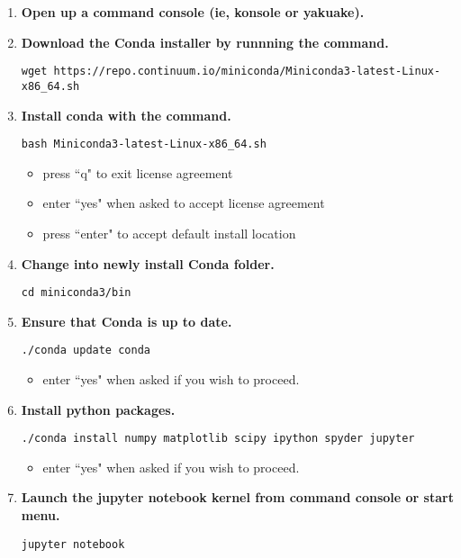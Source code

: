 \documentclass{../../../assets/LabArx-Dev} 	%
\begin{document}
\begin{enumerate}

\item {\bf Open up a command console (ie, konsole or yakuake).}
\item {\bf Download the Conda installer by runnning the command.}

\begin{lstlisting}[backgroundcolor = \color{light-gray}]
wget https://repo.continuum.io/miniconda/Miniconda3-latest-Linux-x86_64.sh
\end{lstlisting}

\item{\bf Install conda with the command.}
\begin{lstlisting}[backgroundcolor = \color{light-gray}]
bash Miniconda3-latest-Linux-x86_64.sh
\end{lstlisting}
\begin{itemize}
\vspace{-1em}
\item press ``q" to exit license agreement
\item enter ``yes" when asked to accept license agreement
\item press ``enter" to accept default install location
\end{itemize}

\item {\bf Change into newly install Conda folder.}
\begin{lstlisting}[backgroundcolor = \color{light-gray}]
cd miniconda3/bin
\end{lstlisting}

\item{\bf Ensure that Conda is up to date.}
\begin{lstlisting}[backgroundcolor = \color{light-gray}]
./conda update conda
\end{lstlisting}
\begin{itemize}
\vspace{-1em}
\item enter ``yes" when asked if you wish to proceed.
\end{itemize}

\item{\bf Install python packages.}
\begin{lstlisting}[backgroundcolor = \color{light-gray}]
./conda install numpy matplotlib scipy ipython spyder jupyter
\end{lstlisting}
\begin{itemize}
\vspace{-1em}
\item enter ``yes" when asked if you wish to proceed.
\end{itemize}

\item {\bf Launch the jupyter notebook kernel from command console or start menu.} 
\begin{lstlisting}[backgroundcolor = \color{light-gray}]
jupyter notebook
\end{lstlisting}
\end{enumerate}
\end{document}
